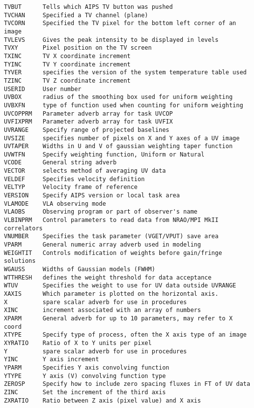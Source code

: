 \begin{verbatim}
TVBUT      Tells which AIPS TV button was pushed
TVCHAN     Specified a TV channel (plane)
TVCORN     Specified the TV pixel for the bottom left corner of an image
TVLEVS     Gives the peak intensity to be displayed in levels
TVXY       Pixel position on the TV screen
TXINC      TV X coordinate increment
TYINC      TV Y coordinate increment
TYVER      specifies the version of the system temperature table used
TZINC      TV Z coordinate increment
USERID     User number
UVBOX      radius of the smoothing box used for uniform weighting
UVBXFN     type of function used when counting for uniform weighting
UVCOPPRM   Parameter adverb array for task UVCOP
UVFIXPRM   Parameter adverb array for task UVFIX
UVRANGE    Specify range of projected baselines
UVSIZE     specifies number of pixels on X and Y axes of a UV image
UVTAPER    Widths in U and V of gaussian weighting taper function
UVWTFN     Specify weighting function, Uniform or Natural
VCODE      General string adverb
VECTOR     selects method of averaging UV data
VELDEF     Specifies velocity definition
VELTYP     Velocity frame of reference
VERSION    Specify AIPS version or local task area
VLAMODE    VLA observing mode
VLAOBS     Observing program or part of observer's name
VLBINPRM   Control parameters to read data from NRAO/MPI MkII correlators
VNUMBER    Specifies the task parameter (VGET/VPUT) save area
VPARM      General numeric array adverb used in modeling
WEIGHTIT   Controls modification of weights before gain/fringe solutions
WGAUSS     Widths of Gaussian models (FWHM)
WTTHRESH   defines the weight threshold for data acceptance
WTUV       Specifies the weight to use for UV data outside UVRANGE
XAXIS      Which parameter is plotted on the horizontal axis.
X          spare scalar adverb for use in procedures
XINC       increment associated with an array of numbers
XPARM      General adverb for up to 10 parameters, may refer to X coord
XTYPE      Specify type of process, often the X axis type of an image
XYRATIO    Ratio of X to Y units per pixel
Y          spare scalar adverb for use in procedures
YINC       Y axis increment
YPARM      Specifies Y axis convolving function
YTYPE      Y axis (V) convolving function type
ZEROSP     Specify how to include zero spacing fluxes in FT of UV data
ZINC       Set the increment of the third axis
ZXRATIO    Ratio between Z axis (pixel value) and X axis
\end{verbatim}\eve


